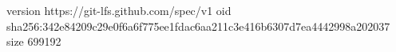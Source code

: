 version https://git-lfs.github.com/spec/v1
oid sha256:342e84209c29e0f6a6f775ee1fdac6aa211c3e416b6307d7ea4442998a202037
size 699192
